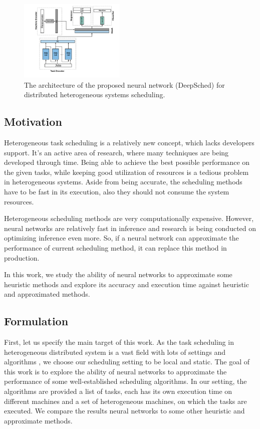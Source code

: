 \begin{figure}[hp]
    \centering
    \includegraphics[width=0.45\textwidth]{diagrams/sched_nn}
    \caption{The architecture of the proposed neural network (DeepSched) for distributed heterogeneous systems scheduling.}
    \label{fig:nn}
\end{figure}

\subsection{Motivation}
Heterogeneous task scheduling is a relatively new concept, which lacks developers support. It's an active area of research, where many techniques are being developed through time. Being able to achieve the best possible performance on the given tasks, while keeping good utilization of resources is a tedious problem in heterogeneous systems. Aside from being accurate, the scheduling methods have to be fast in its execution, also they should not consume the system resources. 

Heterogeneous scheduling methods are very computationally expensive. However, neural networks are relatively fast in inference and research is being conducted on optimizing inference even more. So, if a neural network can approximate the performance of current scheduling method, it can replace this method in production. 

In this work, we study the ability of neural networks to approximate some heuristic methods and explore its accuracy and execution time against heuristic and approximated methods.

\subsection{Formulation}
First, let us specify the main target of this work. As the task scheduling in heterogeneous distributed system is a vast field with lots of settings and algorithms \cite{inbook}, we choose our scheduling setting to be local and static. The goal of this work is to explore the ability of neural networks to approximate the performance of some well-established scheduling algorithms. In our setting, the algorithms are provided a list of tasks, each has its own execution time on different machines and a set of heterogeneous machines, on which the tasks are executed. We compare the results neural networks to some other heuristic and approximate methods.

